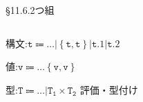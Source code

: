 \documentclass[9pt]{beamer}
\begin{document}
\begin{frame}{\S11.6.2つ組}
\begin{columns}
\begin{column}{0.2\columnwidth}
    構文:$\mathtt{t\Coloneq\ldots|\left\{t, t\right\}|t.1|t.2}$

    値:$\mathtt{v\Coloneq\ldots\left\{v, v\right\}}$

    型:$\mathtt{T\Coloneq \ldots|T_{1}\times T_{2}}$
評価・型付け
\begin{prooftree}
    \end{prooftree}
    \begin{prooftree}
        \end{prooftree}
\end{column}
\begin{column}{0.75\columnwidth}
    \begin{prooftree}
    \end{prooftree}
    \begin{prooftree}
        \end{prooftree}
    \begin{prooftree}
    \end{prooftree}
    \begin{prooftree}
        \end{prooftree}
        \begin{prooftree}
        \end{prooftree}
        \begin{prooftree}
        \end{prooftree}
        \begin{prooftree}
            \end{prooftree}
\end{column}
\end{columns}
\end{frame}
\end{document}
